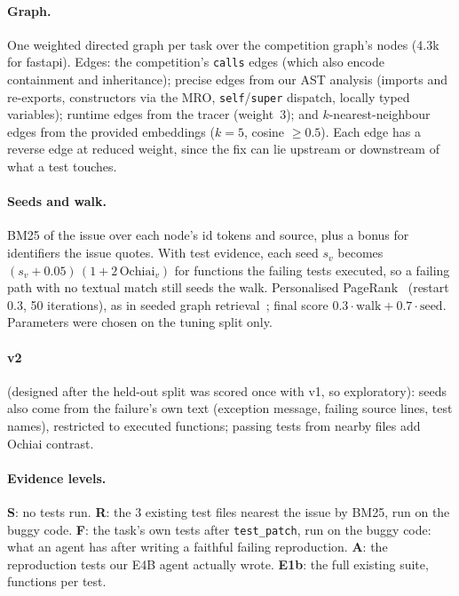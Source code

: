 \documentclass[10pt]{article}
\newcommand{\code}[1]{\texttt{#1}}
\begin{document}
\paragraph{Graph.} One weighted directed graph per task over the competition graph's nodes (4.3k for fastapi). Edges:
the competition's \code{calls} edges (which also encode containment and inheritance); precise edges from our AST
analysis (imports and re-exports, constructors via the MRO, \code{self}/\code{super} dispatch, locally typed variables);
runtime edges from the tracer (weight~3); and $k$-nearest-neighbour edges from the provided embeddings ($k=5$, cosine
$\ge 0.5$). Each edge has a reverse edge at reduced weight, since the fix can lie upstream or downstream of what a test
touches.

\paragraph{Seeds and walk.} BM25 of the issue over each node's id tokens and source, plus a bonus for identifiers the
issue quotes. With test evidence, each seed $s_v$ becomes $(s_v + 0.05)\,(1 + 2\,\mathrm{Ochiai}_v)$ for functions the
failing tests executed, so a failing path with no textual match still seeds the walk. Personalised
PageRank~\cite{haveliwala2002topic} (restart 0.3, 50 iterations), as in seeded graph retrieval~\cite{gutierrez2024hipporag};
final score $0.3\cdot\text{walk} + 0.7\cdot\text{seed}$. Parameters were chosen on the tuning split only.

\paragraph{v2} (designed after the held-out split was scored once with v1, so exploratory): seeds also come from the
failure's own text (exception message, failing source lines, test names), restricted to executed functions; passing
tests from nearby files add Ochiai contrast.

\paragraph{Evidence levels.} \textbf{S}: no tests run. \textbf{R}: the 3 existing test files nearest the issue by BM25,
run on the buggy code. \textbf{F}: the task's own tests after \code{test\_patch}, run on the buggy code: what an agent
has after writing a faithful failing reproduction. \textbf{A}: the reproduction tests our E4B agent actually wrote.
\textbf{E1b}: the full existing suite, functions per test.
\end{document}
